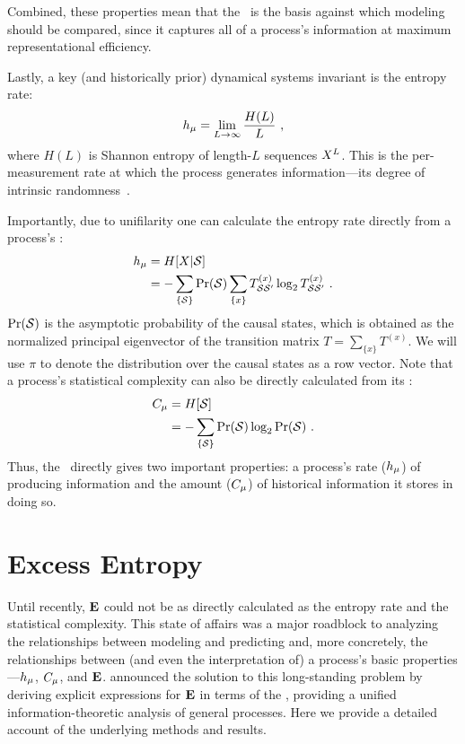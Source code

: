 Combined, these properties mean that the \eM\ is the basis against which
modeling should be compared, since it captures all of a process's
information at maximum representational efficiency.

Lastly, a key (and historically prior) dynamical systems invariant
is the entropy rate:
\begin{equation}
h_\mu = \lim_{L \rightarrow \infty} \frac{H(L)}{L} ~,
\end{equation}
where $H(L)$ is Shannon entropy of length-$L$ sequences ${X}^L$. This
 is the per-measurement rate at which the process generates
information---its degree
of intrinsic randomness~\cite{Shan62,Kolm58}.

Importantly, due to unifilarity one can calculate the entropy rate directly
from a process's \eM:
\begin{align}
h_\mu
  & = H[{X}|\mathcal{S}] \nonumber \\
  & = - \sum_{\{\mathcal{S}\}} \Pr(\mathcal{S})
  \sum_{\{{x}\}} T^{({x})}_{\mathcal{S}\mathcal{S}^\prime}
  \log_2 T^{({x})}_{\mathcal{S}\mathcal{S}^\prime}
  ~  .
\label{eq:hmuEM}
\end{align}
$\Pr(\mathcal{S})$ is the asymptotic
probability of
the causal states, which is obtained as the normalized principal eigenvector
of the transition matrix $T = \sum_{\{x\}} T^{(x)}$.  We will use $\pi$ 
to denote the distribution over the causal states as a row vector. Note that 
a process's statistical complexity can also be directly calculated
from its \eM:
\begin{align}
C_\mu
   & = H[\mathcal{S}] \nonumber \\
   & = - \sum_{\{\mathcal{S}\}} \Pr(\mathcal{S}) \log_2 \Pr(\mathcal{S}) ~.
\end{align}
Thus, the \eM\  directly gives two important properties: a process's rate
($h_\mu$) of producing information and the amount ($C_\mu$) of historical
information it stores in doing so.

\section{Excess Entropy}

Until recently, ${\bf E}$ could not be as directly calculated 
as the entropy rate and the statistical complexity. This state of affairs 
was a major roadblock to analyzing the relationships between modeling
and predicting and, more concretely, the relationships between (and even the
interpretation of) a process's basic properties---$h_\mu$, $C_\mu$, and ${\bf E}$.
 announced the solution to this long-standing problem by 
deriving explicit expressions for ${\bf E}$ in terms of the \eM, providing a 
unified information-theoretic analysis of general processes. Here we
provide a detailed account of the underlying methods and results.


